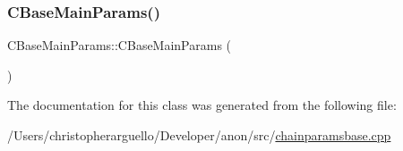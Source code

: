 \subsubsection{\texorpdfstring{C\+Base\+Main\+Params()}{CBaseMainParams()}}
{\footnotesize\ttfamily C\+Base\+Main\+Params\+::\+C\+Base\+Main\+Params (\begin{DoxyParamCaption}{ }\end{DoxyParamCaption})\hspace{0.3cm}{\ttfamily [inline]}}



The documentation for this class was generated from the following file\+:\begin{DoxyCompactItemize}
\item 
/\+Users/christopherarguello/\+Developer/anon/src/\mbox{\hyperlink{chainparamsbase_8cpp}{chainparamsbase.\+cpp}}\end{DoxyCompactItemize}
